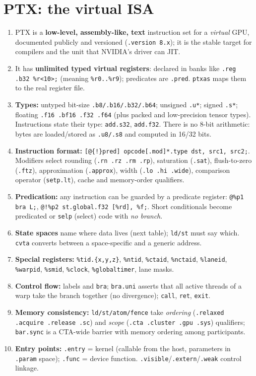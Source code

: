 \documentclass[10pt,a4paper,openany,oneside]{report}
\newcommand{\prio}[1]{\texorpdfstring{\ifcase#1\or{\color{gold}\ding{72}}\or{\color{gold}\ding{72}\ding{72}}\or{\color{gold}\ding{72}\ding{72}\ding{72}}\fi}{}}
\begin{document}
\section{PTX: the virtual ISA \prio{3}}
\begin{mustbox}
\begin{enumerate}[nosep]
\item PTX is a \textbf{low-level, assembly-like, text} instruction set for a \emph{virtual} GPU, documented publicly and versioned (\texttt{.version 8.x}); it is the stable target for compilers and the unit that NVIDIA's driver can JIT.
\item It has \textbf{unlimited typed virtual registers}: declared in banks like \texttt{.reg .b32 \%r<10>;} (meaning \texttt{\%r0..\%r9}); predicates are \texttt{.pred}. \texttt{ptxas} maps them to the real register file.
\item \textbf{Types:} untyped bit-size \texttt{.b8/.b16/.b32/.b64}; unsigned \texttt{.u*}; signed \texttt{.s*}; floating \texttt{.f16 .bf16 .f32 .f64} (plus packed and low-precision tensor types). Instructions state their type: \texttt{add.s32}, \texttt{add.f32}. There is no 8-bit arithmetic: bytes are loaded/stored as \texttt{.u8/.s8} and computed in 16/32 bits.
\item \textbf{Instruction format:} \texttt{[@\{!\}pred] opcode[.mod]*.type dst, src1, src2;}. Modifiers select rounding (\texttt{.rn .rz .rm .rp}), saturation (\texttt{.sat}), flush-to-zero (\texttt{.ftz}), approximation (\texttt{.approx}), width (\texttt{.lo .hi .wide}), comparison operator (\texttt{setp.lt}), cache and memory-order qualifiers.
\item \textbf{Predication:} any instruction can be guarded by a predicate register: \texttt{@\%p1 bra L;}, \texttt{@!\%p2 st.global.f32 [\%rd], \%f;}. Short conditionals become predicated or \texttt{selp} (select) code with \emph{no branch}.
\item \textbf{State spaces} name where data lives (next table); \texttt{ld/st} must say which. \texttt{cvta} converts between a space-specific and a generic address.
\item \textbf{Special registers:} \texttt{\%tid.\{x,y,z\}}, \texttt{\%ntid}, \texttt{\%ctaid}, \texttt{\%nctaid}, \texttt{\%laneid}, \texttt{\%warpid}, \texttt{\%smid}, \texttt{\%clock}, \texttt{\%globaltimer}, lane masks.
\item \textbf{Control flow:} labels and \texttt{bra}; \texttt{bra.uni} asserts that all active threads of a warp take the branch together (no divergence); \texttt{call}, \texttt{ret}, \texttt{exit}.
\item \textbf{Memory consistency:} \texttt{ld/st/atom/fence} take \emph{ordering} (\texttt{.relaxed .acquire .release .sc}) and \emph{scope} (\texttt{.cta .cluster .gpu .sys}) qualifiers; \texttt{bar.sync} is a CTA-wide barrier with memory ordering among participants.
\item \textbf{Entry points:} \texttt{.entry} = kernel (callable from the host, parameters in \texttt{.param} space); \texttt{.func} = device function. \texttt{.visible}/\texttt{.extern}/\texttt{.weak} control linkage.
\end{enumerate}
\end{mustbox}
\end{document}
